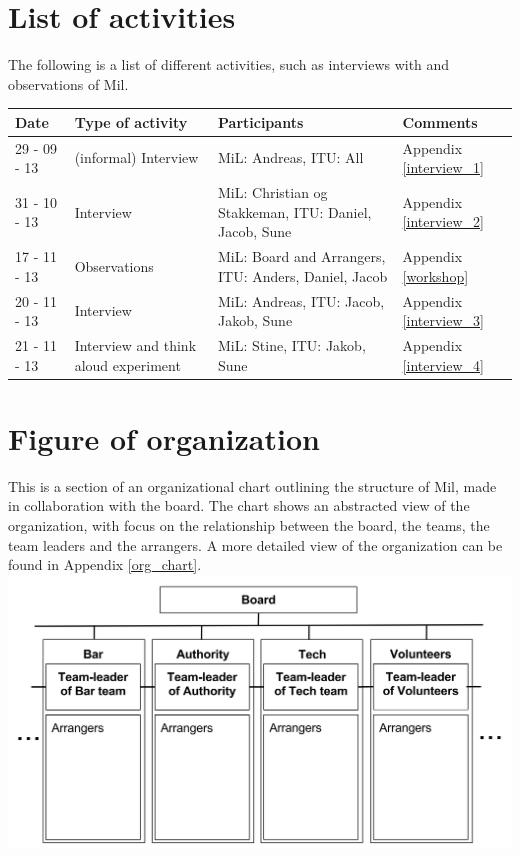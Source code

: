 \section{List of activities}
The following is a list of different activities, such as interviews with and observations of Mil.
\begin{center}
\begin{table}[H]
    \begin{tabular}{|p{3cm}|p{3cm}|p{3cm}|p{6cm}|}
    \hline
    \textbf{Date} & \textbf{Type of activity} & \textbf{Participants} & \textbf{Comments} \\ \hline
    29 - 09 - 13 & (informal) Interview & MiL: Andreas, ITU: All & Appendix  \ref{interview_1}\\ \hline
    31 - 10 - 13 & Interview & MiL: Christian og Stakkeman, ITU: Daniel, Jacob, Sune &  Appendix \ref{interview_2}  \\ \hline
    17 - 11 - 13 & Observations & MiL: Board and Arrangers, ITU: Anders, Daniel, Jacob & Appendix \ref{workshop} \\ \hline
    20 - 11 - 13 & Interview & MiL: Andreas, ITU: Jacob, Jakob, Sune & Appendix \ref{interview_3} \\ \hline
    21 - 11 - 13 & Interview and think aloud experiment & MiL: Stine, ITU: Jakob, Sune & Appendix \ref{interview_4} \\ \hline
    \end{tabular}
\end{table}
\end{center}

\section{Figure of organization}
\label{sec:organisation}
This is a section of an organizational chart outlining the structure of Mil, made in collaboration with the board. The chart shows an abstracted view of the organization, with focus on the relationship between the board, the teams, the team leaders and the arrangers. A more detailed view of the organization can be found in Appendix \ref{org_chart}.\\
\includegraphics[scale=0.7]{Pictures/MIL_Organisational_chart_Abstract.png}
